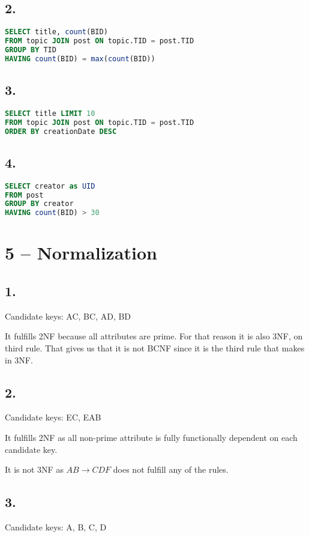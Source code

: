 \documentclass[10pt,a4paper,final]{report}
\begin{document}
\subsection*{2.}
\begin{lstlisting}[language=SQL]
SELECT title, count(BID)
FROM topic JOIN post ON topic.TID = post.TID
GROUP BY TID
HAVING count(BID) = max(count(BID))
\end{lstlisting}

\subsection*{3.}
\begin{lstlisting}[language=SQL]
SELECT title LIMIT 10
FROM topic JOIN post ON topic.TID = post.TID
ORDER BY creationDate DESC
\end{lstlisting}

\subsection*{4.}
\begin{lstlisting}[language=SQL]
SELECT creator as UID
FROM post
GROUP BY creator
HAVING count(BID) > 30
\end{lstlisting}

\section*{5 -- Normalization}
\subsection*{1.}
Candidate keys:
AC, BC, AD, BD

It fulfills 2NF because all attributes are prime.
For that reason it is also 3NF, on third rule.
That gives us that it is not BCNF since it is the third rule that makes in 3NF.

\subsection*{2.}
Candidate keys:
EC, EAB

It fulfills 2NF as all non-prime attribute is fully functionally dependent on each candidate key.

It is not 3NF as $AB \rightarrow CDF$ does not fulfill any of the rules.

\subsection*{3.}
Candidate keys:
A, B, C, D
\end{document}
